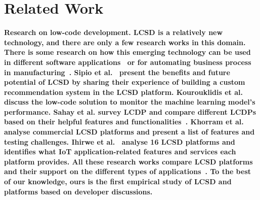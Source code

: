 \section{Related Work} \label{sec:related_work}
\nd\bf{Research on low-code development.} LCSD is a relatively new technology, and there are only a few research works in this domain. There is some research on how this emerging technology can 
be used in different software applications~\cite{lowcodeapp} or for automating business process in manufacturing~\cite{waszkowski2019low-automating}. Sipio et al.~\cite{di2020democratizing} 
present the benefits and future potential of LCSD by sharing their experience of building a custom recommendation system in the LCSD
platform. Kourouklidis et al.~\cite{kourouklidis2020towards} discuss
the low-code solution to monitor the machine learning model's performance. Sahay
et al. survey LCDP and compare different LCDPs based on
their helpful features and functionalities~\cite{sahay2020supporting}. Khorram
et al.~\cite{lowcodetesting} analyse commercial LCSD platforms and present a
list of features and testing challenges. Ihirwe et al.~\cite{lowcodeIot}
analyse 16 LCSD platforms and identifies what IoT application-related features and services each platform provides. All these research works
compare LCSD platforms and their support on the different types
of applications~\cite{alonso2020towards}. To the best of our knowledge, ours is the first empirical study of LCSD and platforms based on developer discussions.


